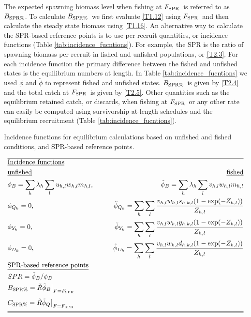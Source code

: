 \documentclass[12pt,letterpaper]{article}
\newcounter{saveEq}
\def\putEq{\setcounter{saveEq}{\value{equation}}}
\def\getEq{\setcounter{equation}{\value{saveEq}}}
\def\tableEq{ %
    \putEq \setcounter{equation}{0}
    \renewcommand{\theequation}{T\arabic{table}.\arabic{equation}}
    \vspace{-5mm}
    }
\def\normalEq{ %
    \getEq
    \renewcommand{\theequation}{\arabic{section}.\arabic{equation}}}
\newcommand{\fspr}{$F_{\textnormal{SPR}}$}
\newcommand{\bspr}{$B_{\textnormal{SPR\%}}$}
\begin{document}
    The expected spawning biomass level when fishing at \fspr\ is referred to as \bspr.  To calculate \bspr\ we first evaluate \eqref{T1.12} using \fspr\ and then calculate the steady state biomass using \eqref{T1.16}. An alternative way to calculate the SPR-based reference points is to use per recruit quantities, or incidence functions (Table \ref{tab:incidence_fucntions}). For example, the SPR is the ratio of spawning biomass per recruit in fished and unfished populations, or \eqref{T2.3}. For each incidence function the primary difference between the fished and unfished states is the equilibrium numbers at length.  In Table \ref{tab:incidence_fucntions} we used $\phi$ and $\tilde{\phi}$ to represent fished and unfished states.    \bspr\ is given by \eqref{T2.4} and the total catch at \fspr\ is given by \eqref{T2.5}.  Other quantities such as the equilibrium  retained catch, or discards,  when fishing at \fspr\ or any other rate can easily be computed using survivorship-at-length schedules and the equilibrium recruitment (Table \ref{tab:incidence_fucntions}).

    \begin{table}
      \centering
      \caption{Incidence functions for equilibrium calculations based on unfished and fished conditions, and SPR-based reference points.}
      \label{tab:incidence_fucntions}
      \tableEq
      \begin{align}
      \hline \nonumber
      &\mbox{\underline{Incidence functions}} \nonumber \\
      &\mbox{\underline{unfished}} &\mbox{\underline{fished}}\nonumber \\
      &\phi_B = \sum_h \lambda_h \sum_l u_{h,l} w_{h,l} m_{h,l}, \qquad
      &\tilde{\phi}_B = \sum_h \lambda_h \sum_l v_{h,l} w_{h,l} m_{h,l} \\
      &\phi_{Q_k} = 0, \qquad
      &\tilde{\phi}_{Q_k} = \sum_h  \sum_l \frac{v_{h,l}  w_{h,l} s_{h,k,l} (1-\exp(-Z_{h,l}))}{Z_{h,l}} \\
      &\phi_{Y_k} = 0, \qquad
      &\tilde{\phi}_{Y_k} = \sum_h  \sum_l \frac{v_{h,l}  w_{h,l} y_{h,k,l} (1-\exp(-Z_{h,l}))}{Z_{h,l}} \\
      &\phi_{D_k} = 0, \qquad
      &\tilde{\phi}_{D_k} = \sum_h  \sum_l \frac{v_{h,l}  w_{h,l} d_{h,k,l} (1-\exp(-Z_{h,l}))}{Z_{h,l}} \\
      &\mbox{\underline{SPR-based reference points}} \nonumber \\
      & SPR = \tilde{\phi}_B/ \phi_B \label{T2.3}\\
      & B_{\textnormal{SPR\%}} = \tilde{R} \tilde{\phi}_B \bigr\rvert _{F=F_{\textnormal{SPR}}} \label{T2.4}\\[1ex]
      & C_{\textnormal{SPR\%}} = \tilde{R} \tilde{\phi}_Q \bigr\rvert _{F=F_{\textnormal{SPR}}} \label{T2.5}\\[1ex]
      \hline \hline \nonumber
      \end{align}
      \normalEq
    \end{table}
\end{document}
